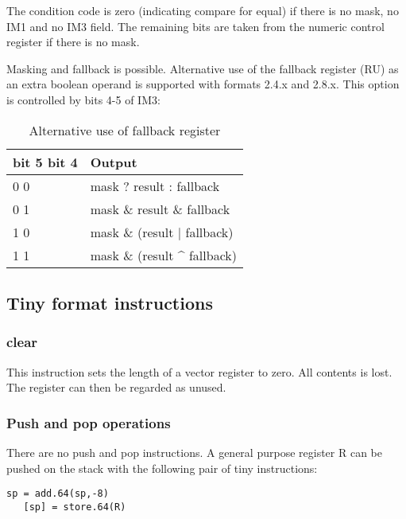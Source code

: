 \documentclass[forwardcom.tex]{subfiles}
\begin{document}
The condition code is zero (indicating compare for equal) if there is no mask, no IM1 and no IM3 field. The remaining bits are taken from the numeric control register if there is no mask.

\vspace{2mm}
Masking and fallback is possible. Alternative use of the fallback register (RU) as an extra boolean operand is supported with formats 2.4.x and 2.8.x. This option is controlled by bits 4-5 of IM3:

\begin{longtable} {|p{25mm}|p{100mm}|}
\caption{Alternative use of fallback register} 
\label{table:AlternativeFallbackForCompare} \\
\endfirsthead
\endhead
\hline
\bfseries bit 5 bit 4 & \bfseries Output \\
\hline
\hspace{5mm} 0 0 & mask ? result : fallback \\
\hline
\hspace{5mm} 0 1 & mask \& result \& fallback \\
\hline
\hspace{5mm} 1 0 & mask \& (result $|$ fallback) \\
\hline
\hspace{5mm} 1 1 & mask \& (result \^{} fallback) \\
\hline
\end{longtable}
\vspace{2mm}


\subsection{Tiny format instructions}
\subsubsection{clear}
This instruction sets the length of a vector register to zero. All contents is lost. The register can then be regarded as unused.

\subsubsection{Push and pop operations}
There are no push and pop instructions. A general purpose register R can be pushed on the stack with the following pair of tiny instructions:

\begin{lstlisting}[frame=none]
   sp = add.64(sp,-8)
   [sp] = store.64(R)
\end{lstlisting}
\end{document}
